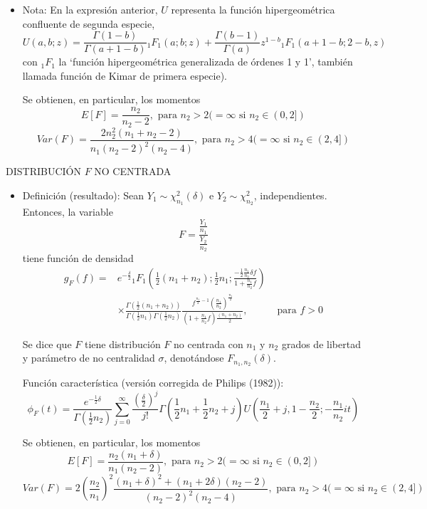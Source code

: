 \documentclass[11pt,a4paper]{article}
\begin{document}
\begin{itemize}
\item Nota: En la expresión anterior, $U$ representa la función hipergeométrica confluente de segunda especie,
$$U(a,b;z) = \frac{\Gamma(1-b)}{\Gamma(a+1-b)}{}_{1}F_{1}(a;b;z) + \frac{\Gamma(b-1)}{\Gamma(a)}z^{1-b} {}_{1}F_{1}(a+1-b; 2-b, z)$$
con ${}_{1}F_{1}$ la `función hipergeométrica generalizada de órdenes 1 y 1', también llamada función de Kimar de primera especie).

Se obtienen, en particular, los momentos
$$E[F] = \frac{n_{2}}{n_{2}-2}, \text{ para } n_{2} > 2 (= \infty \text{ si } n_{2} \in (0, 2])$$
$$Var(F) = \frac{2n_{2}^{2}(n_{1}+n_{2}-2)}{n_{1}(n_{2}-2)^{2}(n_{2}-4)}, \text{ para } n_{2} > 4 (=\infty \text{ si } n_{2} \in (2, 4])$$
\end{itemize}

DISTRIBUCIÓN $F$ NO CENTRADA
\begin{itemize}
\item Definición (resultado): Sean $Y_{1} \sim \chi_{n_{1}}^{2}(\delta)$ e $Y_{2} \sim \chi_{n_{2}}^{2}$, independientes. Entonces, la variable
$$F = \frac{\frac{Y_{1}}{n_{1}}}{\frac{Y_{2}}{n_{2}}}$$
tiene función de densidad
$$\begin{aligned}
g_{F}(f) =  & e^{-\frac{\delta}{2}}{}_{1}F_{1}(\frac{1}{2}(n_{1}+n_{2}); \frac{1}{2}n_{1}; \frac{-\frac{1}{2} \frac{n_{1}}{n_{2}} \delta f}{1 + \frac{n_{1}}{n_{2}}f}) & \\
& \times \frac{\Gamma(\frac{1}{2}(n_{1} + n_{2}))}{\Gamma(\frac{1}{2}n_{1}) \Gamma(\frac{1}{2}n_{2})} \frac{f^{\frac{n_{1}}{2}-1}(\frac{n_{1}}{n_{2}})^{\frac{n_{1}}{2}}}{(1 + \frac{n_{1}}{n_{2}}f) \frac{(n_{1}+n_{2})}{2}}, & \text{ para } f > 0
\end{aligned}$$

Se dice que $F$ tiene distribución $F$ no centrada con $n_{1}$ y $n_{2}$ grados de libertad y parámetro de no centralidad $\sigma$, denotándose $F_{n_{1}, n_{2}}(\delta)$.

Función característica (versión corregida de Philips (1982)):
$$\phi_{F}(t) = \frac{e^{-\frac{1}{2}\delta}}{\Gamma(\frac{1}{2}n_{2})} \sum_{j=0}^{\infty} \frac{(\frac{\delta}{2})^{j}}{j!} \Gamma(\frac{1}{2}n_{1} + \frac{1}{2}n_{2} + j) U(\frac{n_{1}}{2} + j, 1 - \frac{n_{2}}{2}; -\frac{n_{1}}{n_{2}}it)$$

Se obtienen, en particular, los momentos
$$E[F] = \frac{n_{2}(n_{1}+\delta)}{n_{1}(n_{2}-2)}, \text{ para } n_{2} > 2 (=\infty \text{ si } n_{2} \in (0,2])$$
$$Var(F) = 2 (\frac{n_{2}}{n_{1}})^{2} \frac{(n_{1}+\delta)^{2} + (n_{1}+2\delta) (n_{2}-2)}{(n_{2}-2)^{2} (n_{2}-4)}, \text{ para } n_{2} > 4 (=\infty \text{ si } n_{2} \in (2,4])$$
\end{itemize}
\end{document}
